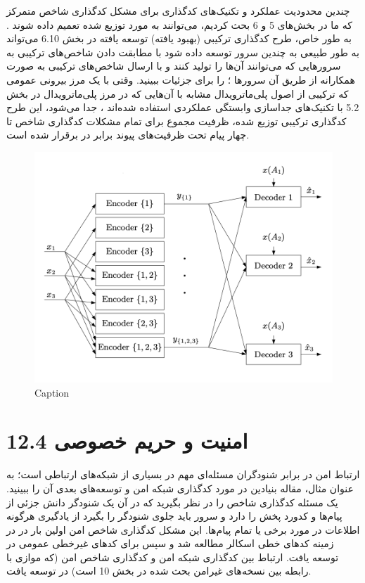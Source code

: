 چندین محدودیت عملکرد و تکنیک‌های کدگذاری برای مشکل کدگذاری شاخص متمرکز که ما در بخش‌های 5 و 6 بحث کردیم، می‌توانند به مورد توزیع شده تعمیم داده شوند \lr{[145, 93, 94, 95]}. به طور خاص، طرح کدگذاری ترکیبی (بهبود یافته) توسعه یافته در بخش 6.10 می‌تواند به طور طبیعی به چندین سرور توسعه داده شود با مطابقت دادن شاخص‌های ترکیبی به سرورهایی که می‌توانند آن‌ها را تولید کنند \lr{[94]} و با ارسال شاخص‌های ترکیبی به صورت همکارانه از طریق آن سرورها \lr{[93]}؛ \lr{[95]} را برای جزئیات ببینید. وقتی با یک مرز بیرونی عمومی که ترکیبی از اصول پلی‌ماترویدال مشابه با آن‌هایی که در مرز پلی‌ماترویدال در بخش 5.2 با تکنیک‌های جداسازی وابستگی عملکردی استفاده شده‌اند \lr{[88, 144]}، جدا می‌شود، این طرح کدگذاری ترکیبی توزیع شده، ظرفیت مجموع برای تمام مشکلات کدگذاری شاخص تا چهار پیام تحت ظرفیت‌های پیوند برابر در \lr{[95]} برقرار شده است.
\begin{figure}
    \centering
    \includegraphics{figs/chapter8/12.2.png}
    \caption{Caption}
    \label{fig:my_label}
\end{figure}

\section{12.4 امنیت و حریم خصوصی}


ارتباط امن در برابر شنودگران مسئله‌ای مهم در بسیاری از شبکه‌های ارتباطی است؛ به عنوان مثال، مقاله بنیادین \lr{[37]} در مورد کدگذاری شبکه امن و توسعه‌های بعدی آن \lr{[36, 38, 136, 64]} را ببینید. یک مسئله کدگذاری شاخص را در نظر بگیرید که در آن یک شنودگر دانش جزئی از پیام‌ها و کدورد پخش را دارد و سرور باید جلوی شنودگر را بگیرد از یادگیری هرگونه اطلاعات در مورد برخی یا تمام پیام‌ها. این مشکل کدگذاری شاخص امن اولین بار در \lr{[51]} در زمینه کدهای خطی اسکالر مطالعه شد و سپس برای کدهای غیرخطی عمومی در \lr{[118]} توسعه یافت. ارتباط بین کدگذاری شبکه امن و کدگذاری شاخص امن (که موازی با رابطه بین نسخه‌های غیرامن بحث شده در بخش 10 است) در \lr{[117]} توسعه یافت.

